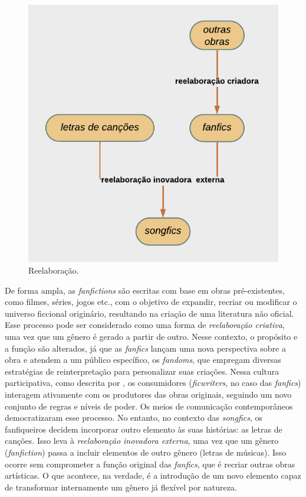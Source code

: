 \begin{figure}[htbp]
    \centering
    \begin{minipage}{.5\textwidth}
    \includegraphics[width=\textwidth]{fig02.png}
    \caption{Reelaboração.}
    \label{fig-02}
    \end{minipage}
\end{figure}

De forma ampla, as \emph{fanfictions} são escritas com base em obras
pré-existentes, como filmes, séries, jogos etc., com o objetivo de
expandir, recriar ou modificar o universo ficcional originário,
resultando na criação de uma literatura não oficial. Esse processo pode
ser considerado como uma forma de \emph{reelaboração criativa}, uma vez
que um gênero é gerado a partir de outro. Nesse contexto, o propósito e
a função são alterados, já que as \emph{fanfics} lançam uma nova
perspectiva sobre a obra e atendem a um público específico, os
\emph{fandoms}, que empregam diversas estratégias de reinterpretação
para personalizar suas criações. Nessa cultura participativa, como
descrita por \textcite{jenkins2009}, os consumidores (\emph{ficwriters}, no caso
das \emph{fanfics}) interagem ativamente com os produtores das obras
originais, seguindo um novo conjunto de regras e níveis de poder. Os
meios de comunicação contemporâneos democratizaram esse processo. No
entanto, no contexto das \emph{songfics}, os fanfiqueiros decidem
incorporar outro elemento às suas histórias: as letras de canções. Isso
leva à \emph{reelaboração inovadora externa}, uma vez que um gênero
(\emph{fanfiction}) passa a incluir elementos de outro gênero (letras de
músicas). Isso ocorre sem comprometer a função original das
\emph{fanfics}, que é recriar outras obras artísticas. O que acontece,
na verdade, é a introdução de um novo elemento capaz de transformar
internamente um gênero já flexível por natureza.

